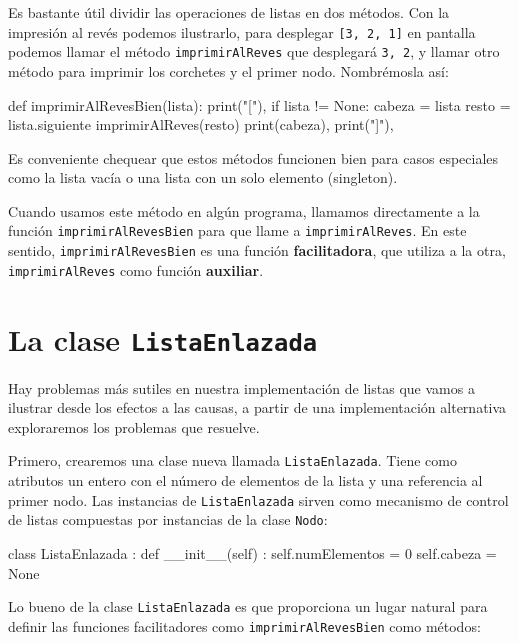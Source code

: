   
  

Es bastante útil dividir las operaciones de listas en dos métodos.
Con la impresión al revés podemos ilustrarlo, para desplegar \texttt{{[}3,
2, 1{]}} en pantalla podemos llamar el método \texttt{imprimirAlReves}
que desplegará \texttt{3, 2}, y llamar otro método para imprimir los
corchetes y el primer nodo. Nombrémosla así:

\beforeverb 
\begin{pythoncode}
def imprimirAlRevesBien(lista):
  print("["),
  if lista != None:
    cabeza = lista
    resto = lista.siguiente
    imprimirAlReves(resto)
    print(cabeza),
  print("]"),
\end{pythoncode}
\afterverb Es conveniente chequear que estos métodos funcionen bien
para casos especiales como la lista vacía o una lista con un solo
elemento (singleton).


Cuando usamos este método en algún programa, llamamos directamente
a la función \texttt{imprimirAlRevesBien} para que llame a \texttt{imprimirAlReves}.
En este sentido, \texttt{imprimirAlRevesBien} es una función \textbf{facilitadora},
que utiliza a la otra, \texttt{imprimirAlReves} como función \textbf{auxiliar}.

\section{La clase \texttt{ListaEnlazada}}

 

Hay problemas más sutiles en nuestra implementación de listas que
vamos a ilustrar desde los efectos a las causas, a partir de una implementación
alternativa exploraremos los problemas que resuelve.

Primero, crearemos una clase nueva llamada \texttt{ListaEnlazada}.
Tiene como atributos un entero con el número de elementos de la lista
y una referencia al primer nodo. Las instancias de \texttt{ListaEnlazada}
sirven como mecanismo de control de listas compuestas por instancias
de la clase \texttt{Nodo}:

\beforeverb 
\begin{pythoncode}
class ListaEnlazada :
  def __init__(self) :
    self.numElementos = 0
    self.cabeza   = None
\end{pythoncode}
\afterverb Lo bueno de la clase \texttt{ListaEnlazada} es que proporciona
un lugar natural para definir las funciones facilitadores como \texttt{imprimirAlRevesBien}
como métodos:

